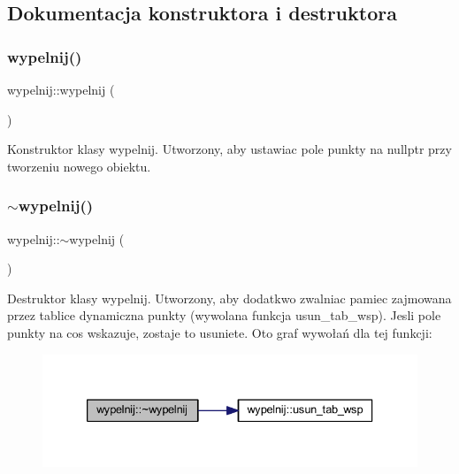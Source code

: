 \subsection{Dokumentacja konstruktora i destruktora}
\mbox{\label{classwypelnij_a42b0cf405df96021ad482478d7886b9e}} 
\subsubsection{\texorpdfstring{wypelnij()}{wypelnij()}}
{\footnotesize\ttfamily wypelnij\+::wypelnij (\begin{DoxyParamCaption}{ }\end{DoxyParamCaption})}

Konstruktor klasy wypelnij. Utworzony, aby ustawiac pole punkty na nullptr przy tworzeniu nowego obiektu. \mbox{\label{classwypelnij_a3bb9c5b24d76cdef56f5683c03277d96}} 
\subsubsection{\texorpdfstring{$\sim$wypelnij()}{~wypelnij()}}
{\footnotesize\ttfamily wypelnij\+::$\sim$wypelnij (\begin{DoxyParamCaption}{ }\end{DoxyParamCaption})}

Destruktor klasy wypelnij. Utworzony, aby dodatkwo zwalniac pamiec zajmowana przez tablice dynamiczna punkty (wywolana funkcja usun\+\_\+tab\+\_\+wsp). Jesli pole punkty na cos wskazuje, zostaje to usuniete. Oto graf wywołań dla tej funkcji\+:
\nopagebreak
\begin{figure}[H]
\begin{center}
\leavevmode
\includegraphics[width=333pt]{classwypelnij_a3bb9c5b24d76cdef56f5683c03277d96_cgraph}
\end{center}
\end{figure}


